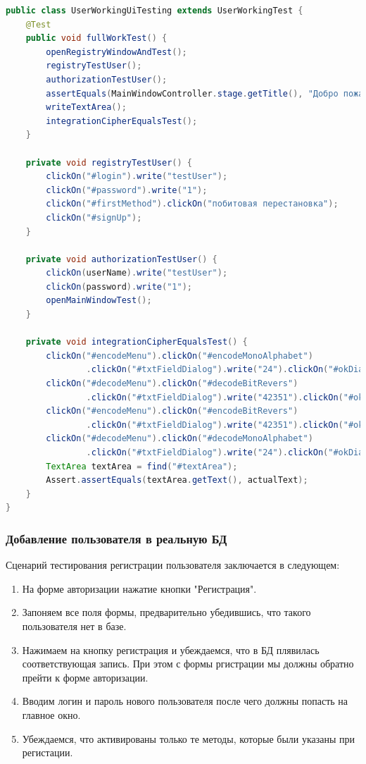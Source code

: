 \documentclass[a4paper,12pt]{article}
\begin{document}
\begin{lstlisting}[language=java, caption=код класса UserWorkingUiTesting, label=lstlisting_system:test_UserWithMethods]
public class UserWorkingUiTesting extends UserWorkingTest {
    @Test
    public void fullWorkTest() {
        openRegistryWindowAndTest();
        registryTestUser();
        authorizationTestUser();
        assertEquals(MainWindowController.stage.getTitle(), "Добро пожаловать, Неизвестный");
        writeTextArea();
        integrationCipherEqualsTest();
    }

    private void registryTestUser() {
        clickOn("#login").write("testUser");
        clickOn("#password").write("1");
        clickOn("#firstMethod").clickOn("побитовая перестановка");
        clickOn("#signUp");
    }

    private void authorizationTestUser() {
        clickOn(userName).write("testUser");
        clickOn(password).write("1");
        openMainWindowTest();
    }

    private void integrationCipherEqualsTest() {
        clickOn("#encodeMenu").clickOn("#encodeMonoAlphabet")
                .clickOn("#txtFieldDialog").write("24").clickOn("#okDialog");
        clickOn("#decodeMenu").clickOn("#decodeBitRevers")
                .clickOn("#txtFieldDialog").write("42351").clickOn("#okDialog");
        clickOn("#encodeMenu").clickOn("#encodeBitRevers")
                .clickOn("#txtFieldDialog").write("42351").clickOn("#okDialog");
        clickOn("#decodeMenu").clickOn("#decodeMonoAlphabet")
                .clickOn("#txtFieldDialog").write("24").clickOn("#okDialog");
        TextArea textArea = find("#textArea");
        Assert.assertEquals(textArea.getText(), actualText);
    }
}

\end{lstlisting}



\subsubsection{Добавление пользователя в реальную БД}
\par Сценарий тестирования регистрации пользователя заключается в следующем:
\begin{enumerate}
\item На форме авторизации нажатие кнопки "Регистрация".
\item Запоняем все поля формы, предварительно убедившись, что такого пользователя нет в базе.
\item Нажимаем на кнопку регистрация и убеждаемся, что в БД плявилась соответствующая запись. При этом с формы ргистрации мы должны обратно прейти к форме авторизации.
\item Вводим логин и пароль нового пользователя после чего должны попасть на главное окно.
\item Убеждаемся, что активированы только те методы, которые были указаны при регистации.
\end{enumerate}
\end{document}
